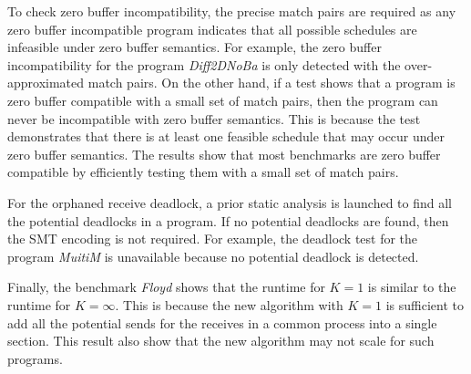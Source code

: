 To check zero buffer incompatibility, the precise match pairs are required as any zero buffer incompatible program indicates that 
all possible schedules are infeasible under zero buffer semantics. For example, the zero buffer incompatibility for the program \textit{Diff2DNoBa} is only detected with the over-approximated match pairs. On the other hand, if a test shows that a program is zero buffer compatible with a small set of match pairs, then the program can never be incompatible with zero buffer semantics. This is because the test demonstrates that there is at least one feasible schedule that may occur under zero buffer semantics. The results show that most benchmarks are zero buffer compatible by efficiently testing them with a small set of match pairs.

For the orphaned receive deadlock, a prior static analysis is launched to find all the potential deadlocks in a program. If no potential deadlocks are found, then the SMT encoding is not required. For example, the deadlock test for the program \textit{MuitiM} is unavailable because no potential deadlock is detected.

Finally, the benchmark \textit{Floyd} shows that the runtime for $K=1$ is similar to the runtime for $K=\infty$. This is because the new algorithm with $K=1$ is sufficient to add all the potential sends for the receives in a common process into a single section. This result also show that the new algorithm may not scale for such programs.
